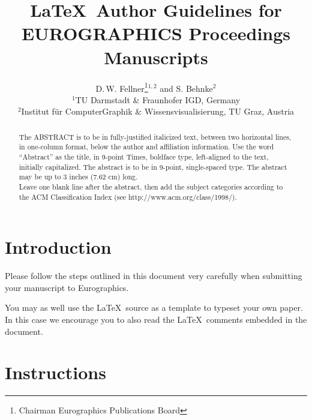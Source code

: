 \documentclass{egpubl}
\title[EG \LaTeX\ Author Guidelines]%
{\LaTeX\ Author Guidelines for EUROGRAPHICS Proceedings Manuscripts}
\author[D. Fellner \& S. Behnke]
{D.\,W. Fellner\thanks{Chairman Eurographics Publications Board}$^{1,2}$
	and S. Behnke$^{2}$
	\\
	$^1$TU Darmstadt \& Fraunhofer IGD, Germany\\
	$^2$Institut f{\"u}r ComputerGraphik \& Wissensvisualisierung, TU Graz, Austria
}
\begin{document}
	
	
	\maketitle
	
	\begin{abstract}
		The ABSTRACT is to be in fully-justified italicized text, 
		between two horizontal lines,
		in one-column format, 
		below the author and affiliation information. 
		Use the word ``Abstract'' as the title, in 9-point Times, boldface type, 
		left-aligned to the text, initially capitalized. 
		The abstract is to be in 9-point, single-spaced type.
		The abstract may be up to 3 inches (7.62 cm) long. \\
		Leave one blank line after the abstract, 
		then add the subject categories according to the ACM Classification Index 
		(see http://www.acm.org/class/1998/).
		
		\begin{classification} %
		\end{classification}
		
	\end{abstract}
	
	
	
	
	
	\section{Introduction}
	
	Please follow the steps outlined in this document very carefully when
	submitting your manuscript to Eurographics.
	
	You may as well use the \LaTeX\ source as a template to typeset your own
	paper. In this case we encourage you to also read the \LaTeX\ comments
	embedded in the document.
	
	\section{Instructions}
	
\end{document}
